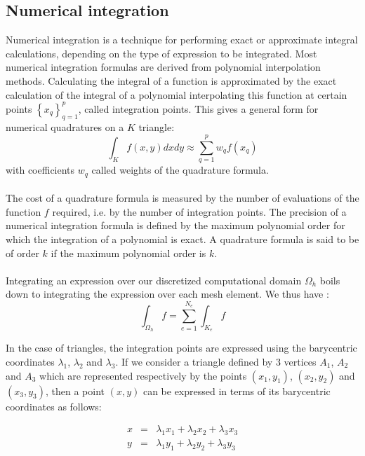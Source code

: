 \documentclass[english,10pt,a4paper]{article}
\begin{document}
\subsection{Numerical integration}

Numerical integration is a technique for performing exact or approximate integral calculations, depending on the type of expression to be integrated.
Most numerical integration formulas are derived from polynomial interpolation methods. Calculating the integral of a function
is approximated by the exact calculation of the integral of a polynomial interpolating this function at certain points $\left\{x_q\right\}_{q=1}^p$, called integration points.
This gives a general form for numerical quadratures on a $K$ triangle:
\begin{equation*}
  \int_K f(x,y) dxdy \approx \sum_{q=1}^p w_q f(x_q)
\end{equation*}
with coefficients $w_q$ called weights of the quadrature formula.

\paragraph{}
The cost of a quadrature formula is measured by the number of evaluations of the function $f$ required, i.e. by the number of integration points.
The precision of a numerical integration formula is defined by the maximum polynomial order for which the integration of a polynomial is exact.
A quadrature formula is said to be of order $k$ if the maximum polynomial order is $k$. 

\paragraph{}
Integrating an expression over our discretized computational domain $\Omega_h$ boils down to integrating the expression over each mesh element.
We thus have :
\begin{equation*}
  \int_{\Omega_h} f = \sum_{e=1}^{N_e} \int_{K_e} f
\end{equation*}

In the case of triangles, the integration points are expressed using the barycentric coordinates $\lambda_1$, $\lambda_2$ and $\lambda_3$.
If we consider a triangle defined by 3 vertices $A_1$, $A_2$ and $A_3$ which are represented respectively by the points $(x_1,y_1)$, $(x_2,y_2)$ and $(x_3,y_3)$, then
a point $(x,y)$ can be expressed in terms of its barycentric coordinates as follows:

\begin{eqnarray*}
  x &=& \lambda_1 x_1 + \lambda_2 x_2 + \lambda_3 x_3 \\
  y &=& \lambda_1 y_1 + \lambda_2 y_2 + \lambda_3 y_3
\end{eqnarray*}
\end{document}
